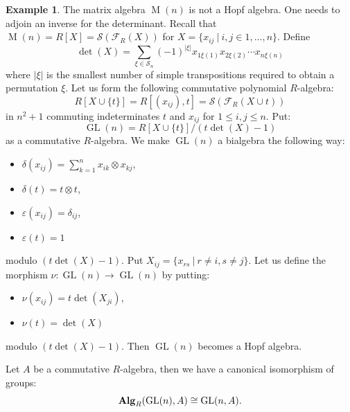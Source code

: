 \documentclass[8pt]{article}
\theoremstyle{definition}
\theoremstyle{definition}
\theoremstyle{definition}
\theoremstyle{definition}
\theoremstyle{definition}
\theoremstyle{definition}
\theoremstyle{definition}
\theoremstyle{definition}
\theoremstyle{definition}
\theoremstyle{definition}
\theoremstyle{definition}
\theoremstyle{definition}
\newtheorem{example}{Example}[section]
\theoremstyle{definition}
\theoremstyle{definition}
\theoremstyle{question}
\begin{document}
\begin{example}
  The matrix algebra $\operatorname{M}(n)$ is not a Hopf algebra. One needs to adjoin an inverse for the determinant.
  Recall that $\operatorname{M}(n) = R [ X ] = \mathcal{S}(\mathcal{F}_R(X))$ for $X = \{ x_{ij} \: | \: i, j \in {1, \ldots, n}\}$.
  Define
  \[
  \operatorname{det}(X) = \sum \limits_{\xi \in \mathcal{S}_n} (-1)^{|\xi|} x_{1 \xi(1)} x_{2 \xi(2)} \cdots x_{n \xi(n)}
  \]
  where $|\xi|$ is the smallest number of simple transpositions required to obtain a permutation $\xi$. Let us form the following
  commutative polynomial $R$-algebra:
  \[
  R [ X \cup \{ t\} ] = R [ (x_{ij}), t ] = \mathcal{S}(\mathcal{F}_R(X \cup {t}))
  \]
  in $n^2 + 1$ commuting indeterminates $t$ and $x_{ij}$ for $1 \leq i, j \leq n$. Put:
  \[
  \operatorname{GL}(n) = R [X \cup \{ t \}] / (t \operatorname{det}(X) - 1)
  \]
  as a commutative $R$-algebra. We make $\operatorname{GL}(n)$ a bialgebra the following way:
  \begin{itemize}
    \item $\delta(x_{ij}) = \sum \limits_{k = 1}^n x_{ik} \otimes x_{kj}$,
    \item $\delta(t) = t \otimes t$,
    \item $\varepsilon(x_{ij}) = \delta_{ij}$,
    \item $\varepsilon(t) = 1$
  \end{itemize}
  modulo $(t \operatorname{det}(X) - 1)$. Put $X_{ij} = \{ x_{rs} \: | \: r \neq i, s \neq j \}$. Let us define
  the morphism $\nu : \operatorname{GL}(n) \to \operatorname{GL}(n)$ by putting:
  \begin{itemize}
    \item $\nu(x_{ij}) = t \operatorname{det}(X_{ji})$,
    \item $\nu(t) = \operatorname{det}(X)$
  \end{itemize}
  modulo $(t \operatorname{det}(X) - 1)$. Then $\operatorname{GL}(n)$ becomes a Hopf algebra. 

  Let $A$ be a commutative $R$-algebra, then we have a canonical isomorphism of groups:
  \[
  {\bf Alg}_R(\operatorname{GL}(n), A) \cong \operatorname{GL}(n, A).
  \]
\end{example}
\end{document}
